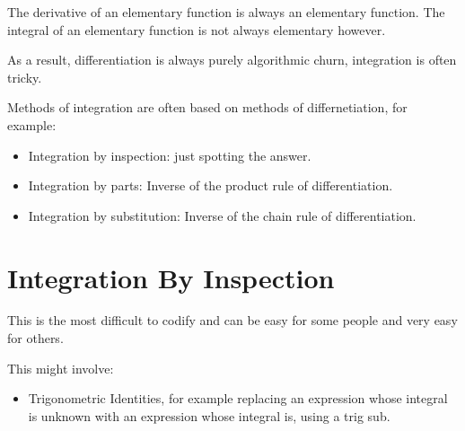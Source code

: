 
\begin{tcolorbox}
    The derivative of an elementary function is always an elementary function. The integral of an elementary function is not always elementary however.

    As a result, differentiation is always purely algorithmic churn, integration is often tricky.
\end{tcolorbox}

Methods of integration are often based on methods of differnetiation, for example:
\begin{itemize}
    \item Integration by inspection: just spotting the answer.
    \item Integration by parts: Inverse of the product rule of differentiation.
    \item Integration by substitution: Inverse of the chain rule of differentiation.
\end{itemize}

\section{Integration By Inspection}
This is the most difficult to codify and can be easy for some people and very easy for others.

This might involve:
\begin{itemize}
    \item Trigonometric Identities, for example replacing an expression whose integral is unknown with an expression whose integral is, using a trig sub.
\end{itemize}

